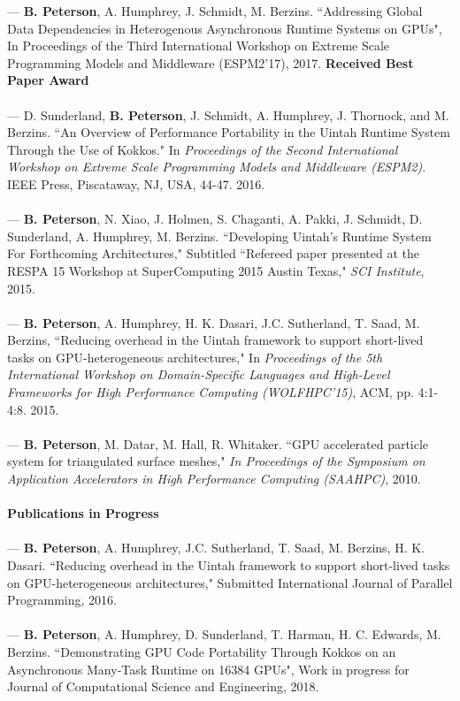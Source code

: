 \documentclass[12pt]{article}
\begin{document}
\cite{espm2-brad}  --- \textbf{B. Peterson}, A. Humphrey, J. Schmidt, M. Berzins.  ``Addressing Global Data Dependencies in Heterogenous Asynchronous Runtime Systems on GPUs", In {Proceedings of the Third International Workshop on Extreme Scale Programming Models and Middleware (ESPM2'17)}, 2017. \textbf{Received Best Paper Award}\\
\\
\cite{espm2-16}  --- D. Sunderland, \textbf{B. Peterson}, J. Schmidt, A. Humphrey, J. Thornock, and M. Berzins. ``An Overview of Performance Portability in the Uintah Runtime System Through the Use of Kokkos."  In \textit{Proceedings of the Second International Workshop on Extreme Scale Programming Models and Middleware (ESPM2)}. IEEE Press, Piscataway, NJ, USA, 44-47. 2016.  \\
\\
\cite{respa-techreport-15} --- \textbf{B. Peterson}, N. Xiao, J. Holmen, S. Chaganti, A. Pakki, J. Schmidt, D. Sunderland, A. Humphrey, M. Berzins. ``Developing Uintah's Runtime System For Forthcoming Architectures," Subtitled ``Refereed paper presented at the RESPA 15 Workshop at SuperComputing 2015 Austin Texas," \textit{SCI Institute}, 2015.\\
\\
\cite{wolfhpc15} --- \textbf{B. Peterson}, A. Humphrey, H. K. Dasari, J.C. Sutherland, T. Saad, M. Berzins, ``Reducing overhead in the Uintah framework to support short-lived tasks on GPU-heterogeneous architectures," In \textit{Proceedings of the 5th International Workshop on Domain-Specific Languages and High-Level Frameworks for High Performance Computing (WOLFHPC'15)}, ACM, pp. 4:1-4:8. 2015.\\
\\
\cite{saahpc-2010-brad} --- \textbf{B. Peterson}, M. Datar, M. Hall, R. Whitaker.  ``GPU accelerated particle system for triangulated surface meshes," \textit{In Proceedings of the Symposium on Application Accelerators in High Performance Computing (SAAHPC)}, 2010.\\
\\
\textbf{Publications in Progress}\\
\\
\cite{ijpp16} --- \textbf{B. Peterson},  A. Humphrey, J.C. Sutherland, T. Saad, M. Berzins, H. K. Dasari. ``Reducing overhead in the Uintah framework to support short-lived tasks on GPU-heterogeneous architectures," Submitted International Journal of Parallel Programming, 2016.\\
\\
\cite{jocs18} --- \textbf{B. Peterson}, A. Humphrey, D. Sunderland, T. Harman, H. C. Edwards, M. Berzins. ``Demonstrating GPU Code Portability Through Kokkos on an Asynchronous Many-Task Runtime on 16384 GPUs",  Work in progress for Journal of Computational Science and Engineering, 2018.\\
\end{document}
